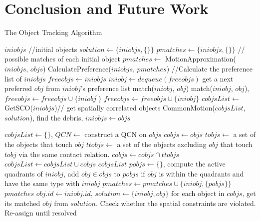 \documentclass[letterpaper]{article}
\begin{document}
\section{Conclusion and Future Work}
\begin{algorithm}[!]
\caption{The Object Tracking Algorithm}\label{algo}
\begin{algorithmic}[1]
\State $iniobjs$ //initial objects
\State $solution \leftarrow \{iniobjs, \{\}\}$
\State $pmatches \leftarrow \{iniobjs, \{\}\}$ // possible matches of each initial object
\State $pmatches \leftarrow$ MotionApproximation($iniobjs$, $objs$) \label{SetPossible}
\State CalculatePreference($iniobjs$, $pmatches$)\label{calPref} //Calculate the preference list of $iniobjs$
\State $freeobjs \leftarrow iniobjs$
\label{stableMarriage}
\State $iniobj \leftarrow dequeue(freeobjs)$
\State get a next preferred $obj$ from $iniobj$'s preference list  
  \State match($iniobj$, $obj$)
  \State match($iniobj$, $obj$), $freeobjs \leftarrow freeobjs \cup \{iniobj^{\prime}\}$
  \Else 
  \State $freeobjs \leftarrow freeobjs \cup \{iniobj\}$
\EndIf 
\EndIf
\EndWhile
\State $cobjsList \leftarrow$ GetSCO($iniobjs$)// get spatially correlated objects
\State CommonMotion($cobjsList$,$solution$), find the debris, $iniobjs \leftarrow objs$
\EndProcedure

\label{getSCO}
\State $cobjsList \leftarrow \{\}$, $QCN \leftarrow$ construct a QCN on $objs$
\State $cobjs \leftarrow objs$ 
\State $tobjs \leftarrow$ a set of the objects that touch $obj$
\State $ttobjs \leftarrow$ a set of the objects excluding $obj$ that touch $tobj$ via the same contact relation.
\State $cobjs \leftarrow cobjs \cap ttobjs$
\EndFor
\State $cobjsList \leftarrow cobjsList \cup cobjs$
\EndFor
\Return $cobjsList$
\EndProcedure
{}\label{MA}
\State $pobjs \leftarrow \{\}$, compute the active quadrants of $iniobj$, add $obj \in objs$ to $pobjs$ if $obj$ is within the quadrants and have the same type with $iniobj$ 
\State $pmatches \leftarrow pmatches \cup \{iniobj, \{pobjs\}\}$
\EndFor
\Return $pmatches$
\EndProcedure
{}
\State $obj.id \leftarrow iniobj.id$, $solution \leftarrow \{iniobj, obj\}$
\EndProcedure
{}\label{CommonMotion}
\State for each object in $cobjs$, get its matched $obj$ from $solution$. Check whether the spatial constraints are violated. Re-assign until resolved  
\EndFor
\EndProcedure
\end{algorithmic}
\end{algorithm}
\newpage



 
\end{document}
